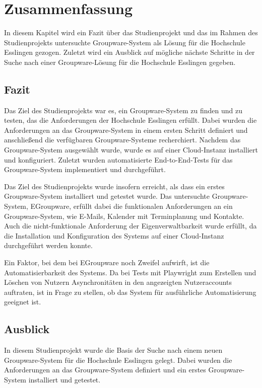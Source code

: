 \chapter{Zusammenfassung}

In diesem Kapitel wird ein Fazit über das Studienprojekt und das im Rahmen des Studienprojekts untersuchte Groupware-System als Lösung für die Hochschule Esslingen gezogen.
Zuletzt wird ein Ausblick auf mögliche nächste Schritte in der Suche nach einer Groupware-Lösung für die Hochschule Esslingen gegeben.

\section{Fazit}

Das Ziel des Studienprojekts war es, ein Groupware-System zu finden und zu testen, das die Anforderungen der Hochschule Esslingen erfüllt.
Dabei wurden die Anforderungen an das Groupware-System in einem ersten Schritt definiert und anschließend die verfügbaren Groupware-Systeme recherchiert.
Nachdem das Groupware-System ausgewählt wurde, wurde es auf einer Cloud-Instanz installiert und konfiguriert.
Zuletzt wurden automatisierte End-to-End-Tests für das Groupware-System implementiert und durchgeführt.

Das Ziel des Studienprojekts wurde insofern erreicht, als dass ein erstes Groupware-System installiert und getestet wurde.
Das untersuchte Groupware-System, EGroupware, erfüllt dabei die funktionalen Anforderungen an ein Groupware-System, wie E-Mails, Kalender mit Terminplanung und Kontakte.
Auch die nicht-funktionale Anforderung der Eigenverwaltbarkeit wurde erfüllt, da die Installation und Konfiguration des Systems auf einer Cloud-Instanz durchgeführt werden konnte.

Ein Faktor, bei dem bei EGroupware noch Zweifel aufwirft, ist die Automatisierbarkeit des Systems.
Da bei Tests mit Playwright zum Erstellen und Löschen von Nutzern Asynchronitäten in den angezeigten Nutzeraccounts auftraten, ist in Frage zu stellen, ob das System für ausführliche Automatisierung geeignet ist.


\section{Ausblick}

In diesem Studienprojekt wurde die Basis der Suche nach einem neuen Groupware-System für die Hochschule Esslingen gelegt.
Dabei wurden die Anforderungen an das Groupware-System definiert und ein erstes Groupware-System installiert und getestet.

